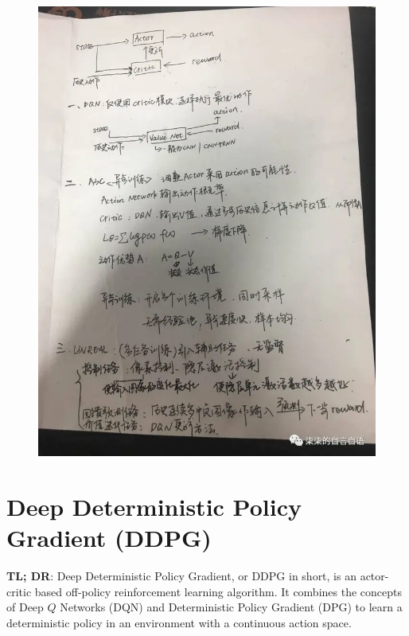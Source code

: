 \begin{figure}[H]
\centering
\includegraphics[scale=0.118]{pix/td3/2.png}
\end{figure}

\section{Deep Deterministic Policy Gradient (DDPG)}


{\bf TL; DR}: Deep Deterministic Policy Gradient, or DDPG in short, is an 
actor-critic based off-policy reinforcement learning algorithm. It combines 
the concepts of Deep $Q$ Networks (DQN) and Deterministic Policy Gradient (DPG) 
to learn a deterministic policy in an environment with a continuous action space.

